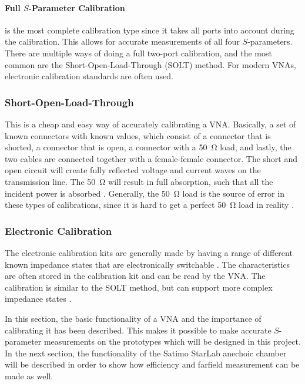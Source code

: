 \paragraph{Full $S$-Parameter Calibration} is the most complete calibration type since it takes all ports into account during the calibration. This allows for accurate measurements of all four $S$-parameters. There are multiple ways of doing a full two-port calibration, and the most common are the Short-Open-Load-Through (SOLT) method. For modern VNAs, electronic calibration standards are often used. 

\subsubsection{Short-Open-Load-Through}
This is a cheap and easy way of accurately calibrating a VNA. Basically, a set of known connectors with known values, which consist of a connector that is shorted, a connector that is open, a connector with a \SI{50}{\ohm} load, and lastly, the two cables are connected together with a female-female connector. The short and open circuit will create fully reflected voltage and current waves on the transmission line. The \SI{50}{\ohm} will result in full absorption, such that all the incident power is absorbed \cite{agilentAppNoteVNA}. Generally, the \SI{50}{\ohm} load is the source of error in these types of calibrations, since it is hard to get a perfect \SI{50}{\ohm} load in reality \cite{nationalInstruVNA}. 

\subsubsection{Electronic Calibration}
The electronic calibration kits are generally made by having a range of different known impedance states that are electronically switchable \cite{agilentEcal}. The characteristics are often stored in the calibration kit and can be read by the VNA. The calibration is similar to the SOLT method, but can support more complex impedance states \cite{agilentEcal}. 

\begin{aautail}
    In this section, the basic functionality of a VNA and the importance of calibrating it has been described. This makes it possible to make accurate $S$-parameter measurements on the prototypes which will be designed in this project. In the next section, the functionality of the Satimo StarLab anechoic chamber will be described in order to show how efficiency and farfield measurement can be made as well.
\end{aautail}



